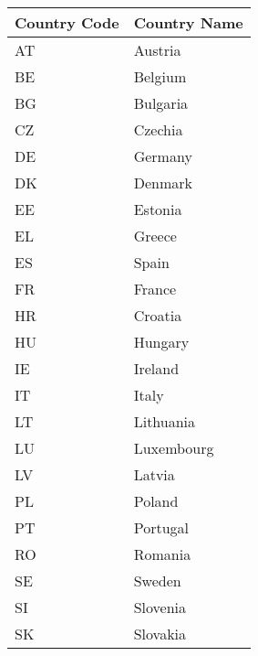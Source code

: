\begin{tabular}{ |p{6cm}| p{10cm} |}

  \hline
  Country Code &Country Name\\
   \hline
AT&Austria\\
BE&Belgium\\
BG&Bulgaria\\
CZ&Czechia\\
DE&Germany\\
DK&Denmark\\
EE&Estonia\\
EL&Greece\\
ES&Spain\\
FR&France\\
HR&Croatia\\
HU&Hungary\\
IE&Ireland\\
IT&Italy\\
LT&Lithuania\\
LU&Luxembourg\\
LV&Latvia\\
PL&Poland\\
PT&Portugal\\
RO&Romania\\
SE&Sweden\\
SI&Slovenia\\
SK&Slovakia\\
\hline
\end{tabular}

